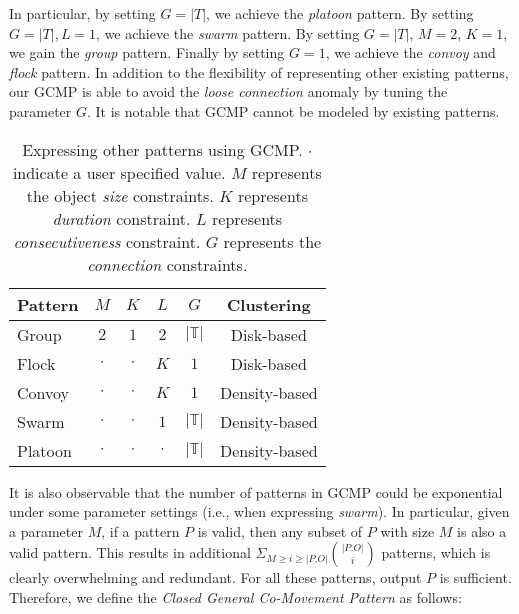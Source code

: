 In particular, by setting $G=|T|$, we achieve the \emph{platoon} pattern. By setting $G=|T|,L=1$, we achieve the \emph{swarm} pattern. By setting $G=|T|$, $M=2$, $K=1$, we gain the \emph{group} pattern. Finally by setting $G=1$, we achieve the \emph{convoy} and \emph{flock} pattern. 
In addition to the flexibility of representing other existing patterns, our GCMP is able to avoid the \emph{loose connection} anomaly by tuning the parameter $G$. 
%
It is notable that GCMP cannot be modeled by existing patterns. %

\begin{table}
\centering
\begin{tabular}{|l|c|c|c|c|c|}
\hline 
Pattern & $M$ & $K$ & $L$ & $G$ & Clustering\\ 
\hline
Group & $2$ & $1$ & $2$ & $|\mathbb{T}|$ & Disk-based\\
\hline
Flock & $\cdot$ & $\cdot$ & $K$ & $1$ & Disk-based \\
\hline 
Convoy & $\cdot$ & $\cdot$ & $K$ & $1$ & Density-based\\ 
\hline 
Swarm & $\cdot$ & $\cdot$ & $1$ & $|\mathbb{T}|$ & Density-based \\ 
\hline 
Platoon & $\cdot$ & $\cdot$ & $\cdot$ & $|\mathbb{T}|$ & Density-based\\ 
\hline 
\end{tabular} 
\caption{Expressing other patterns using GCMP. $\cdot$ indicate a user specified value. $M$ represents the 
object \emph{size} constraints. $K$ represents \emph{duration} constraint. $L$ represents \emph{consecutiveness} constraint. $G$ represents the \emph{connection} constraints.}
\label{tbl:patterns}
\end{table}
 
It is also observable that the number of patterns in GCMP could be exponential under some parameter settings (i.e., 
when expressing \emph{swarm}). In particular, given a parameter $M$, if a pattern $P$ is valid, then any subset of $P$ with 
size $M$ is also a valid pattern. This results in additional $\Sigma_{M\geq i \geq |P.O|} {|P.O| \choose i}$ patterns,
which is clearly overwhelming and redundant. For all these patterns, output $P$ is sufficient. Therefore, we define the \emph{Closed General Co-Movement Pattern} as follows:
%

